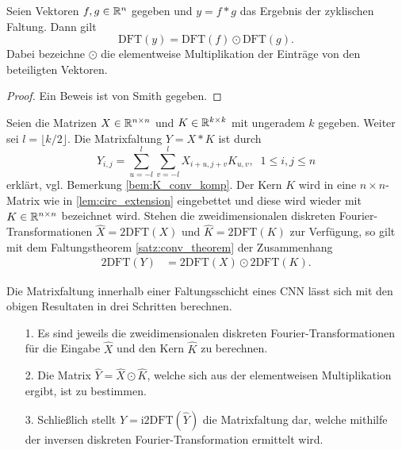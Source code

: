 \begin{satz}
    \label{satz:conv_theorem}
    Seien Vektoren $f,g \in \mathbb{R}^{n}$ gegeben und $y= f \ast g$ das Ergebnis der zyklischen Faltung. Dann gilt
    \begin{equation}
        \mathrm{DFT}(y)=\mathrm{DFT}(f) \odot \mathrm{DFT}(g).
    \end{equation}
    Dabei bezeichne $\odot$ die elementweise Multiplikation der Einträge von den beteiligten Vektoren.
\end{satz}
\begin{proof}
    Ein Beweis ist von Smith\cite{smith2007mathematics} gegeben.
\end{proof}
\begin{bem}
    Seien die Matrizen $X \in \mathbb{R}^{n \times n}$ und $K \in \mathbb{R}^{k \times k}$ mit ungeradem $k$ gegeben. Weiter sei $l=\lfloor k/2 \rfloor$. Die Matrixfaltung $Y= X \ast K$ ist durch
    \begin{equation*}
        Y_{i,j}=\sum_{u=-l}^l \sum_{v=-l}^l X_{i+u, j+v} K_{u,v}, \; \; 1 \leq i, j \leq n
    \end{equation*}
    erklärt, vgl. Bemerkung \ref{bem:K_conv_komp}.
    Der Kern $K$ wird in eine $n \times n$-Matrix wie in \ref{lem:circ_extension} eingebettet und diese wird wieder mit $K \in \mathbb{R}^{n \times n}$ bezeichnet wird. Stehen die zweidimensionalen diskreten Fourier-Transformationen $\hat{X}=\mathrm{2DFT}(X)$ und $\hat{K}=\mathrm{2DFT}(K)$ zur Verfügung, so gilt mit dem Faltungstheorem \ref{satz:conv_theorem} der Zusammenhang
    \begin{align*}
        \mathrm{2DFT}(Y)&=\mathrm{2DFT}(X) \odot \mathrm{2DFT}(K). 
    \end{align*}
\end{bem}
Die Matrixfaltung innerhalb einer Faltungsschicht eines CNN lässt sich mit den obigen Resultaten in drei Schritten berechnen.
\begin{itemize}
    \item[1.] Es sind jeweils die zweidimensionalen diskreten Fourier-Transformationen für die Eingabe $\hat{X}$ und den Kern $\hat{K}$ zu berechnen.
    \item[2.] Die Matrix $\hat{Y}= \hat{X} \odot \hat{K}$, welche sich aus der elementweisen Multiplikation ergibt, ist zu bestimmen.
    \item[3.] Schließlich stellt $Y=\mathrm{i2DFT}(\hat{Y})$ die Matrixfaltung dar, welche mithilfe der inversen diskreten Fourier-Transformation ermittelt wird.    
\end{itemize} 
